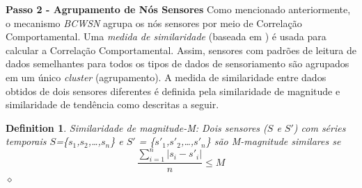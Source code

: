 \documentclass{acm_proc_article-sp}
\newcommand{\dia}{\hspace*{.1cm} \hfill $\diamond$}
\begin{document}
{\bf Passo 2 - Agrupamento de Nós Sensores}
Como mencionado anteriormente, o mecanismo {\it BCWSN} agrupa os nós sensores
por meio de Correlação Comportamental. Uma \textit{medida de similaridade} 
(baseada em \cite{Liu2007}) é usada para calcular a Correlação Comportamental. 
Assim, sensores com padrões de leitura de dados semelhantes para todos os 
tipos de dados de sensoriamento são agrupados em um único {\it cluster} (agrupamento). 
A medida de similaridade entre dados obtidos de dois sensores diferentes 
é definida pela similaridade de magnitude e similaridade de tendência como
descritas a seguir.
\vspace*{-.3cm}

\newtheorem{defini}{Definition}

\begin{defini}
Similaridade de magnitude-M: Dois sensores ($S$ e $S'$) com séries temporais
$S$=\{$s_{1}$,$s_{2}$,\ldots,$s_{n}$\} e
$S'$ = \{$s'_{1}$,$s'_{2}$,\ldots,$s'_{n}$\} são M-magnitude similares se 
\begin{equation}
\label{equ:magni}
\frac{\sum_{i=1}^{n} |s_{i}-s'_{i}|}{n} \leq M
\end{equation}
\dia
\end{defini}
\vspace*{-.9cm}
\end{document}
